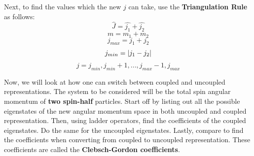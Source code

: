 \documentclass{article}
\begin{document}
\begin{flushleft}
Next, to find the values which the new $j$ can take, use the \textbf{Triangulation Rule} as follows:
$$\hat{J}=\hat{j_1}+\hat{j_2}$$
$$m=m_1+m_2$$
$$j_{max}=j_1+j_2$$
$$j_{min}=\abs{j_1-j_2}$$
$$j=j_{min},j_{min}+1,...,j_{max}-1,j_{max}$$

Now, we will look at how one can switch between coupled and uncoupled representations. The system to be considered will be the total spin angular momentum of \textbf{two spin-half} particles. Start off by listing out all the possible eigenstates of the new angular momentum space in both uncoupled and coupled representation. Then, using ladder operators, find the coefficients of the coupled eigenstates. Do the same for the uncoupled eigenstates. Lastly, compare to find the coefficients when converting from coupled to uncoupled
representation. These coefficients are called the\textbf{ Clebsch-Gordon coefficients}.


\end{flushleft}
\end{document}

